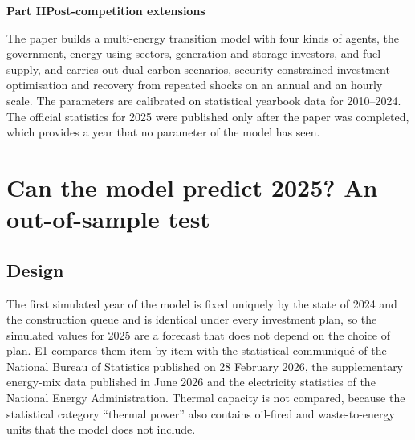 \clearpage
{}

\setcounter{page}{1}
\begin{center}{\Large\bfseries Part II\quad Post-competition extensions}\end{center}

The paper builds a multi-energy transition model with four kinds of agents, the government, energy-using sectors, generation and storage investors, and fuel supply, and carries out dual-carbon scenarios, security-constrained investment optimisation and recovery from repeated shocks on an annual and an hourly scale. The parameters are calibrated on statistical yearbook data for 2010--2024. The official statistics for 2025 were published only after the paper was completed, which provides a year that no parameter of the model has seen.

\section{Can the model predict 2025? An out-of-sample test}

\subsection{Design}
The first simulated year of the model is fixed uniquely by the state of 2024 and the construction queue and is identical under every investment plan, so the simulated values for 2025 are a forecast that does not depend on the choice of plan. E1 compares them item by item with the statistical communiqué of the National Bureau of Statistics published on 28 February 2026, the supplementary energy-mix data published in June 2026 and the electricity statistics of the National Energy Administration. Thermal capacity is not compared, because the statistical category ``thermal power'' also contains oil-fired and waste-to-energy units that the model does not include.

